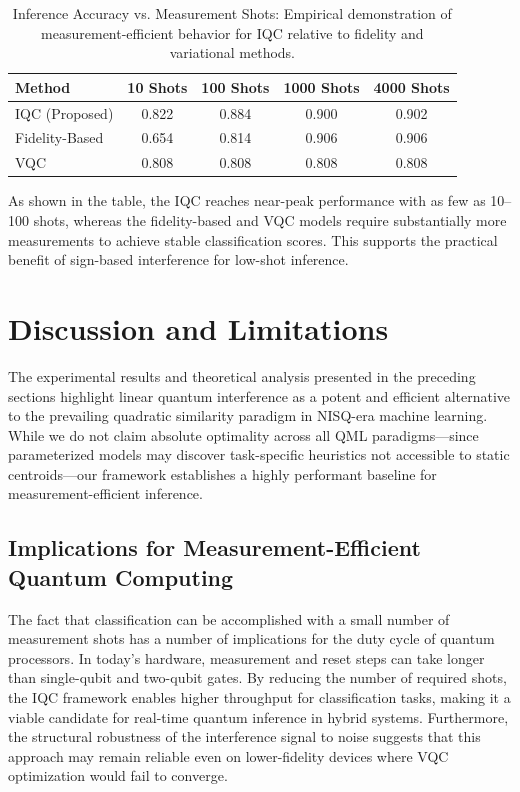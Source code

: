 \documentclass[conference]{IEEEtran}
\begin{document}
\begin{table}[ht]
\centering
\caption{Inference Accuracy vs. Measurement Shots: Empirical demonstration of measurement-efficient behavior for IQC relative to fidelity and variational methods.}
\begin{tabular}{l c c c c}
\toprule
Method & 10 Shots & 100 Shots & 1000 Shots & 4000 Shots \\
\midrule
IQC (Proposed) & 0.822 & 0.884 & 0.900 & 0.902 \\
Fidelity-Based & 0.654 & 0.814 & 0.906 & 0.906 \\
VQC & 0.808 & 0.808 & 0.808 & 0.808 \\
\bottomrule
\end{tabular}
\end{table}

As shown in the table, the IQC reaches near-peak performance with as few as 10--100 shots, whereas the fidelity-based and VQC models require substantially more measurements to achieve stable classification scores. This supports the practical benefit of sign-based interference for low-shot inference.

\section{Discussion and Limitations}

The experimental results and theoretical analysis presented in the preceding sections highlight linear quantum interference as a potent and efficient alternative to the prevailing quadratic similarity paradigm in NISQ-era machine learning. While we do not claim absolute optimality across all QML paradigms—since parameterized models may discover task-specific heuristics not accessible to static centroids—our framework establishes a highly performant baseline for measurement-efficient inference.

\subsection{Implications for Measurement-Efficient Quantum Computing}

The fact that classification can be accomplished with a small number of measurement shots has a number of implications for the duty cycle of quantum processors. In today’s hardware, measurement and reset steps can take longer than single-qubit and two-qubit gates. By reducing the number of required shots, the IQC framework enables higher throughput for classification tasks, making it a viable candidate for real-time quantum inference in hybrid systems. Furthermore, the structural robustness of the interference signal to noise suggests that this approach may remain reliable even on lower-fidelity devices where VQC optimization would fail to converge.
\end{document}
